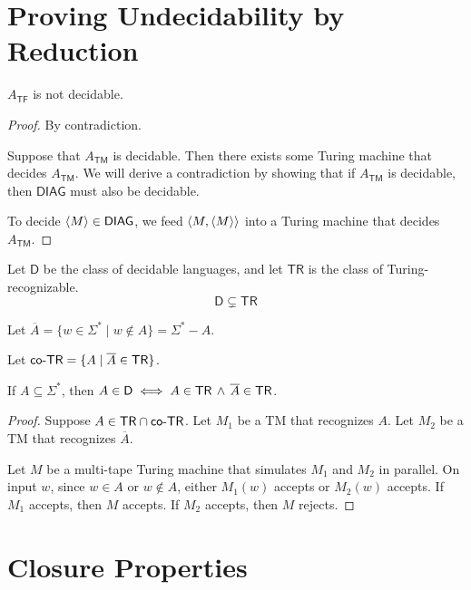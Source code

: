 \section{Proving Undecidability by Reduction}

\begin{theorem}
    $A_{\mathsf{TF}}$ is not decidable.
\end{theorem}

\begin{proof}
    By contradiction.

    Suppose that $A_{\mathsf{TM}}$ is decidable. Then there exists some Turing machine that decides $A_{\mathsf{TM}}$. We will derive a contradiction by showing that if $A_{\mathsf{TM}}$ is decidable, then $\mathsf{DIAG}$ must also be decidable.

    To decide $\langle M \rangle \in \mathsf{DIAG}$, we feed $\langle  M,\langle M \rangle  \rangle$ into a Turing machine that decides $A_{\mathsf{TM}}$. 
\end{proof}

\begin{corollary}
    Let $\mathsf{D}$ be the class of decidable languages, and let $\mathsf{TR}$ is the class of Turing-recognizable.
    $$
    \mathsf{D} \subsetneq \mathsf{TR}
    $$
\end{corollary}

Let $\overline{A} = \{ w \in \Sigma^* \mid w \not\in A \} = \Sigma^* - A$.

Let $\mathsf{co}\text{-}\mathsf{TR} = \{ A \mid \overline{A} \in \mathsf{TR} \}$.

\begin{theorem}
    If $A \subseteq \Sigma^*$, then $A \in \mathsf{D} \iff A \in \mathsf{TR}\, \land\, \overline{A} \in \mathsf{TR}$.
\end{theorem}

\begin{proof}
    Suppose $A \in \mathsf{TR} \cap \mathsf{co}\text{-}\mathsf{TR}$. Let $M_1$ be a TM that recognizes $A$. Let $M_2$ be a TM that recognizes $\overline{A}$.

    Let $M$ be a multi-tape Turing machine that simulates $M_1$ and $M_2$ in parallel. On input $w$, since $w \in A$ or $w \not\in A$, either $M_1(w)$ accepts or $M_2(w)$ accepts. If $M_1$ accepts, then $M$ accepts. If $M_2$ accepts, then $M$ rejects.
\end{proof}

\section{Closure Properties}

